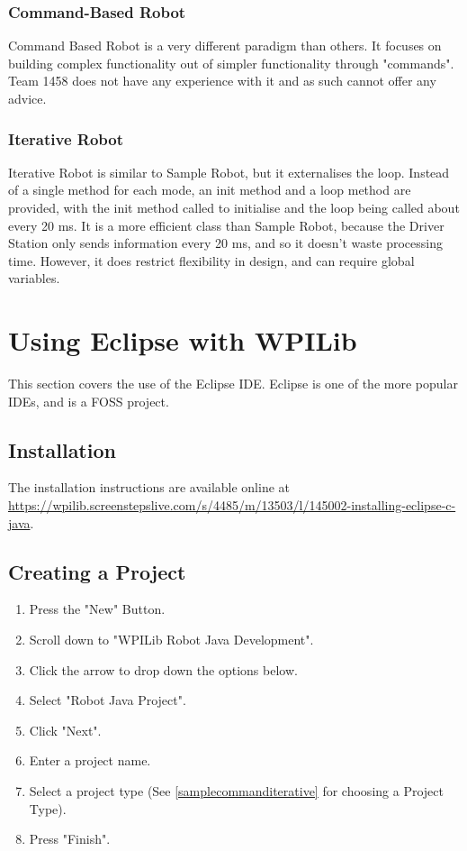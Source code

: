 \documentclass[]{report}
\begin{document}
\subsubsection{Command-Based Robot}
Command Based Robot is a very different paradigm than others.
It focuses on building complex functionality out of simpler functionality through "commands".
Team 1458 does not have any experience with it and as such cannot offer any advice.

\subsubsection{Iterative Robot}
Iterative Robot is similar to Sample Robot, but it externalises the loop.
Instead of a single method for each mode, an init method and a loop method are provided, with the init method called to initialise and the loop being called about every 20 ms.
It is a more efficient class than Sample Robot, because the Driver Station only sends information every 20 ms, and so it doesn't waste processing time. However, it does restrict flexibility in design, and can require global variables.

\section{Using Eclipse with WPILib}
This section covers the use of the Eclipse IDE.
Eclipse is one of the more popular IDEs, and is a FOSS project.


\subsection{Installation}
The installation instructions are available online at \url{https://wpilib.screenstepslive.com/s/4485/m/13503/l/145002-installing-eclipse-c-java}.

\subsection{Creating a Project}
\begin{enumerate}
\item Press the "New" Button.
\item Scroll down to "WPILib Robot Java Development".
\item Click the arrow to drop down the options below.
\item Select "Robot Java Project".
\item Click "Next".
\item Enter a project name.
\item Select a project type (See \ref{samplecommanditerative} for choosing a Project Type).
\item Press "Finish".
\end{enumerate}
\end{document}

